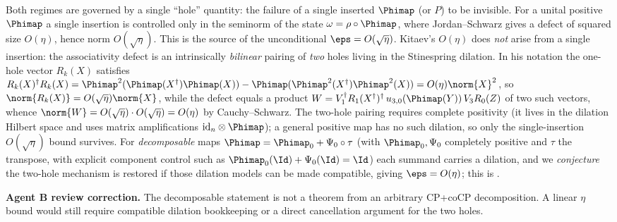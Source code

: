 \begin{remark}
\label{rem:exponent}
Both regimes are governed by a single ``hole'' quantity: the failure of a
single inserted $\Phimap$ (or $P$) to be invisible. For a unital positive
$\Phimap$ a single insertion is controlled only in the seminorm of the state
$\omega=\rho\circ\Phimap$, where Jordan--Schwarz gives a defect of squared size
$O(\eta)$, hence norm $O(\sqrt\eta)$. This is the source of the unconditional
$\eps=O(\sqrt\eta)$. Kitaev's $O(\eta)$ does \emph{not} arise from a single
insertion: the associativity defect is an intrinsically \emph{bilinear} pairing
of \emph{two} holes living in the Stinespring dilation. In his notation the
one-hole vector $R_k(X)$ satisfies
$R_k(X)^\dagger R_k(X)
 =\Phimap^2(\Phimap(X^\dagger)\Phimap(X))
 -\Phimap(\Phimap^2(X^\dagger)\Phimap^2(X))=O(\eta)\norm{X}^2$,
so $\norm{R_k(X)}=O(\sqrt\eta)\norm{X}$, while the defect equals a product
$W=V_1^\dagger R_1(X^\dagger)^\dagger\,u_{3,0}(\Phimap(Y))\,V_3 R_0(Z)$ of two
such vectors, whence $\norm{W}=O(\sqrt\eta)\cdot O(\sqrt\eta)=O(\eta)$ by
Cauchy--Schwarz. The two-hole pairing requires complete positivity (it lives in
the dilation Hilbert space and uses matrix amplifications
$\mathrm{id}_n\otimes\Phimap$); a general positive map has no such dilation, so
only the single-insertion $O(\sqrt\eta)$ bound survives. For
\emph{decomposable} maps
$\Phimap=\Phimap_0+\Psi_0\circ\tau$ (with $\Phimap_0,\Psi_0$ completely positive
and $\tau$ the transpose, with explicit component control such as
$\Phimap_0(\Id)+\Psi_0(\Id)=\Id$) each summand carries a dilation, and we
\emph{conjecture} the two-hole mechanism is restored if those dilation models
can be made compatible, giving $\eps=O(\eta)$; this is .

\smallskip\noindent\textbf{Agent B review correction.}
The decomposable statement is not a theorem from an arbitrary CP+coCP
decomposition. A linear $\eta$ bound would still require compatible dilation
bookkeeping or a direct cancellation argument for the two holes.
\end{remark}

